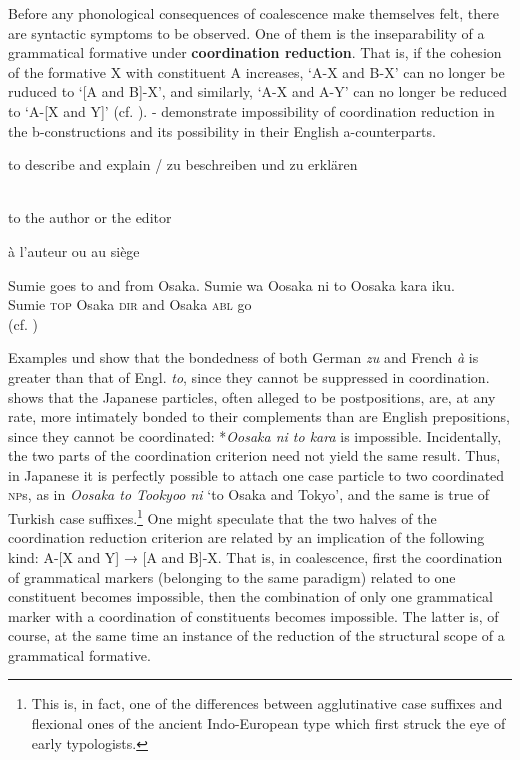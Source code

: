 Before any phonological consequences of coalescence make themselves felt, there are syntactic symptoms to be observed. One of them is the inseparability of a grammatical formative under \textbf{coordination reduction}. That is, if the cohesion of the formative X with constituent A increases, ‘A-X and B-X’ can no longer be ruduced to ‘[A and B]-X’, and similarly, ‘A-X and A-Y’ can no longer be reduced to ‘A-[X and Y]’ (cf. \citet[198-201]{MallinsonEtAl1981}).  -  demonstrate impossibility of coordination reduction in the b-constructions and its possibility in their English a-counterparts.

\ea\label{ex:}
\langinfo{\LangGerm}{}{} 

 to describe and explain  / zu beschreiben und zu erklären\\
\z

\ea\label{ex:}
\langinfo{\LangFren}{}{} \\

to the author or the editor

à l'auteur ou au siège\\
\z


\ea\label{ex:}
 \ea  Sumie goes to and from Osaka. 
\ex
\gll Sumie  wa  Oosaka  ni  to  Oosaka  kara  iku.\\
   Sumie  \textsc{top}  Osaka  \textsc{dir}  and  Osaka  \textsc{abl}  go\\
(cf. \citet[201]{MallinsonEtAl1981})\\
\z
\z

Examples  und  show that the bondedness of both German \textit{zu} and French \textit{à} is greater than that of Engl. \textit{to}, since they cannot be suppressed in coordination.  shows that the Japanese particles, often alleged to be postpositions, are, at any rate, more intimately bonded to their complements than are English prepositions, since they cannot be coordinated: *\textit{Oosaka ni to kara} is impossible. Incidentally, the two parts of the coordination criterion need not yield the same result. Thus, in Japanese it is perfectly possible to attach one case particle to two coordinated \textsc{np}s, as in \textit{Oosaka to Tookyoo ni} ‘to Osaka and Tokyo’, and the same is true of Turkish case suffixes.\footnote{This is, in fact, one of the differences between agglutinative case suffixes and flexional ones of the ancient Indo-European type which first struck the eye of early typologists.} One might speculate that the two halves of the coordination reduction criterion are related by an implication of the following kind: A-[X and Y] → [A and B]-X. That is, in coalescence, first the coordination of grammatical markers (belonging to the same paradigm) related to one constituent becomes impossible, then the combination of only one grammatical marker with a coordination of constituents becomes impossible. The latter is, of course, at the same time an instance of the reduction of the structural scope of a grammatical formative.


